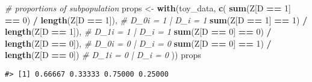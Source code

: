 \documentclass[
]{article}
\newenvironment{Shaded}{\begin{snugshade}}{\end{snugshade}}
\newcommand{\CommentTok}[1]{\textcolor[rgb]{0.56,0.35,0.01}{\textit{#1}}}
\newcommand{\DecValTok}[1]{\textcolor[rgb]{0.00,0.00,0.81}{#1}}
\newcommand{\KeywordTok}[1]{\textcolor[rgb]{0.13,0.29,0.53}{\textbf{#1}}}
\newcommand{\NormalTok}[1]{#1}
\newcommand{\OperatorTok}[1]{\textcolor[rgb]{0.81,0.36,0.00}{\textbf{#1}}}
\newcommand{\StringTok}[1]{\textcolor[rgb]{0.31,0.60,0.02}{#1}}
\begin{document}
\begin{Shaded}
\begin{Highlighting}[]
\CommentTok{\# proportions of subpopulation }
\NormalTok{props \textless{}{-}}\StringTok{ }\KeywordTok{with}\NormalTok{(toy\_data, }
              \KeywordTok{c}\NormalTok{(}
    \KeywordTok{sum}\NormalTok{(Z[D }\OperatorTok{==}\StringTok{ }\DecValTok{1}\NormalTok{] }\OperatorTok{==}\StringTok{ }\DecValTok{0}\NormalTok{) }\OperatorTok{/}\StringTok{ }\KeywordTok{length}\NormalTok{(Z[D }\OperatorTok{==}\StringTok{ }\DecValTok{1}\NormalTok{]), }\CommentTok{\# D\_0i = 1 | D\_i = 1}
    \KeywordTok{sum}\NormalTok{(Z[D }\OperatorTok{==}\StringTok{ }\DecValTok{1}\NormalTok{] }\OperatorTok{==}\StringTok{ }\DecValTok{1}\NormalTok{) }\OperatorTok{/}\StringTok{ }\KeywordTok{length}\NormalTok{(Z[D }\OperatorTok{==}\StringTok{ }\DecValTok{1}\NormalTok{]), }\CommentTok{\# D\_1i = 1 | D\_i = 1}
    \KeywordTok{sum}\NormalTok{(Z[D }\OperatorTok{==}\StringTok{ }\DecValTok{0}\NormalTok{] }\OperatorTok{==}\StringTok{ }\DecValTok{0}\NormalTok{) }\OperatorTok{/}\StringTok{ }\KeywordTok{length}\NormalTok{(Z[D }\OperatorTok{==}\StringTok{ }\DecValTok{0}\NormalTok{]), }\CommentTok{\# D\_0i = 0 | D\_i = 0}
    \KeywordTok{sum}\NormalTok{(Z[D }\OperatorTok{==}\StringTok{ }\DecValTok{0}\NormalTok{] }\OperatorTok{==}\StringTok{ }\DecValTok{1}\NormalTok{) }\OperatorTok{/}\StringTok{ }\KeywordTok{length}\NormalTok{(Z[D }\OperatorTok{==}\StringTok{ }\DecValTok{0}\NormalTok{])  }\CommentTok{\# D\_1i = 0 | D\_i = 0}
\NormalTok{  ))}
\NormalTok{props}
\end{Highlighting}
\end{Shaded}

\begin{verbatim}
#> [1] 0.66667 0.33333 0.75000 0.25000
\end{verbatim}
\end{document}
